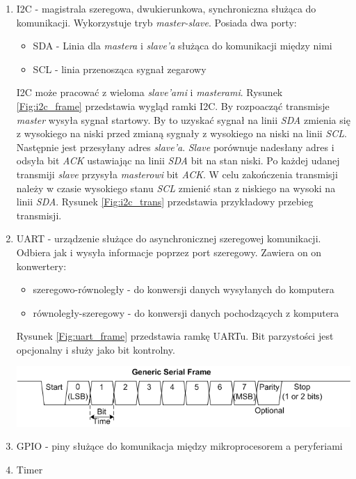 \documentclass[11pt,a4paper]{article}
\begin{document}
\begin{enumerate}
			\item I2C - magistrala szeregowa, dwukierunkowa, synchroniczna służąca do komunikacji. Wykorzystuje tryb \textit{master-slave}. Posiada dwa porty:
			\begin{itemize}
				\item SDA - Linia dla \textit{mastera} i \textit{slave'a} służąca do komunikacji między nimi
				\item SCL - linia przenosząca sygnał zegarowy
			\end{itemize}
			I2C może pracować z wieloma \textit{slave'ami} i \textit{masterami}. Rysunek \ref{Fig:i2c_frame} przedstawia wygląd ramki I2C. By rozpoacząć transmisje \textit{master} wysyła sygnał startowy. By to uzyskać sygnał na linii \textit{SDA} zmienia się z wysokiego na niski przed zmianą sygnały z wysokiego na niski na linii \textit{SCL}. Następnie jest przesyłany adres \textit{slave'a}. \textit{Slave} porównuje nadesłany adres i odsyła bit \textit{ACK} ustawiając na linii \textit{SDA} bit na stan niski. Po każdej udanej transmiji \textit{slave} przysyła \textit{masterowi} bit \textit{ACK}. W celu zakończenia transmisji należy w czasie wysokiego stanu \textit{SCL} zmienić stan z niskiego na wysoki na linii \textit{SDA}. Rysunek \ref{Fig:i2c_trans} przedstawia przykładowy przebieg transmisji.\cite{i2c_book}


			\item UART - urządzenie służące do asynchronicznej szeregowej komunikacji. Odbiera jak i wysyła informacje poprzez port szeregowy. Zawiera on on konwertery:
			\begin{itemize}
				\item szeregowo-równoległy - do konwersji danych wysyłanych do komputera
				\item równoległy-szeregowy - do konwersji danych pochodzących z komputera
			\end{itemize}	
			Rysunek \ref{Fig:uart_frame} przedstawia ramkę UARTu. Bit parzystości jest opcjonalny i służy jako bit kontrolny.\cite{uart_book}
			\begin{samepage}
				\nopagebreak
				\begin{center}
					\includegraphics[width=13cm]{./rysunki/uart_frame.png}
				\end{center}
			\end{samepage}
			\item GPIO - piny służące do komunikacja między mikroprocesorem a peryferiami \cite{gpio_doc}
			\item Timer
			\end{enumerate}
\end{document}
